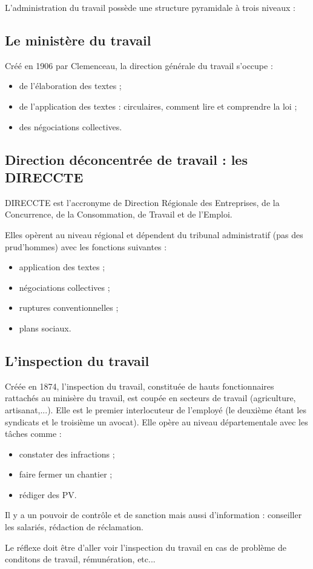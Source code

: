 L'administration du travail possède une structure pyramidale à trois niveaux :

\subsection{Le ministère du travail}
	
	Créé en 1906 par Clemenceau, la direction générale du travail s'occupe :
	\begin{itemize}
		\item de l'élaboration des textes ;
		\item de l'application des textes : circulaires, comment lire et comprendre la loi ;
		\item des négociations collectives.
	\end{itemize}


\subsection{Direction déconcentrée de travail : les DIRECCTE}

	DIRECCTE est l'accronyme de Direction Régionale des Entreprises, de la Concurrence, de la Consommation, de Travail et de l'Emploi.
	
	Elles opèrent au niveau régional et dépendent du tribunal administratif (pas des prud'hommes) avec les fonctions suivantes :
	\begin{itemize}
		\item application des textes ;
		\item négociations collectives ;
		\item ruptures conventionnelles ;
		\item plans sociaux.
	\end{itemize}


\subsection{L'inspection du travail}

	Créée en 1874, l'inspection du travail, constituée de hauts fonctionnaires rattachés au minisère du travail, est coupée en secteurs de travail (agriculture, artisanat,...).
	Elle est le premier interlocuteur de l'employé (le deuxième étant les syndicats et le troisième un avocat).
	Elle opère au niveau départementale avec les tâches comme :
	\begin{itemize}
		\item constater des infractions ;
		\item faire fermer un chantier ;
		\item rédiger des PV.
	\end{itemize}
	Il y a un pouvoir de contrôle et de sanction mais aussi d'information : conseiller les salariés, rédaction de réclamation.
	
	Le réflexe doit être d'aller voir l'inspection du travail en cas de problème de conditons de travail, rémunération, etc...

